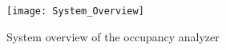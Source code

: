 \begin{figure}[h!]
	\centering
		\texttt{[image: System\_Overview]}
	\caption{System overview of the occupancy analyzer}
 \end{figure}